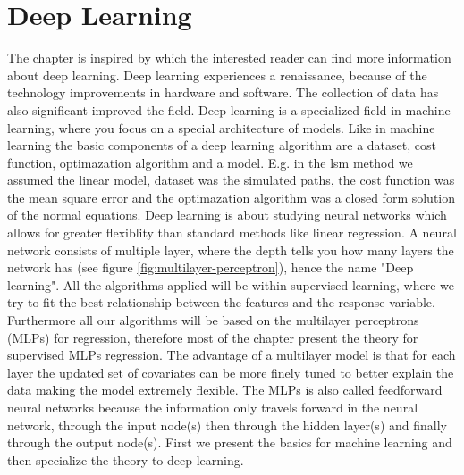 
\chapter{Deep Learning} %

\label{Chapter4} %

The chapter is inspired by \parencite{Goodfellow-et-al-2016,Mackay18} which the interested reader can find more information about deep learning. Deep learning experiences a renaissance, because of the technology improvements in hardware and software. The collection of data has also significant improved the field. Deep learning is a specialized field in machine learning, where you focus on a special architecture of models. Like in machine learning the basic components of a deep learning algorithm are a dataset, cost function, optimazation algorithm and a model. E.g. in the lsm method we assumed the linear model, dataset was the simulated paths, the cost function was the mean square error and the optimazation algorithm was a closed form solution of the normal equations. Deep learning is about studying neural networks which allows for greater flexiblity than standard methods like linear regression. A neural network consists of multiple layer, where the depth tells you how many layers the network has (see figure \ref{fig:multilayer-perceptron}), hence the name "Deep learning". All the algorithms applied will be within supervised learning, where we try to fit the best relationship between the features and the response variable. Furthermore all our algorithms will be based on the multilayer perceptrons (MLPs) for regression, therefore most of the chapter present the theory for supervised MLPs regression. The advantage of a multilayer model is that for each layer the updated set of covariates can be more finely tuned to better explain the data making the model extremely flexible. The MLPs is also called feedforward neural networks because the information only travels forward in the neural network, through the input node(s) then through the hidden layer(s) and finally through the output node(s). First we present the basics for machine learning and then specialize the theory to deep learning.

